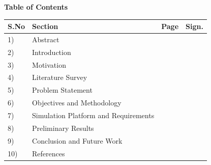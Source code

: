 \documentclass[11pt,a4paper]{article}
\begin{document}
\begin{center}
{\Large\bfseries Table of Contents}\\[0.6cm]
\begin{tabular}{|p{1.2cm}|p{9.6cm}|p{1.3cm}|p{2.2cm}|}
\hline
\textbf{S.No} & \textbf{Section} & \textbf{Page} & \textbf{Sign.} \\ \hline
1)  & Abstract                               & \pageref{sec:abstract}   & \\[10pt] \hline
2)  & Introduction                           & \pageref{sec:intro}      & \\[10pt] \hline
3)  & Motivation                             & \pageref{sec:motivation} & \\[10pt] \hline
4)  & Literature Survey                      & \pageref{sec:lit}        & \\[10pt] \hline
5)  & Problem Statement                      & \pageref{sec:problem}    & \\[10pt] \hline
6)  & Objectives and Methodology             & \pageref{sec:method}     & \\[10pt] \hline
7)  & Simulation Platform and Requirements   & \pageref{sec:platform}   & \\[10pt] \hline
8)  & Preliminary Results                    & \pageref{sec:results}    & \\[10pt] \hline
9)  & Conclusion and Future Work             & \pageref{sec:conclusion} & \\[10pt] \hline
10) & References                             & \pageref{sec:refs}       & \\[10pt] \hline
\end{tabular}
\end{center}
\thispagestyle{empty}
\newpage
{}

\end{document}
